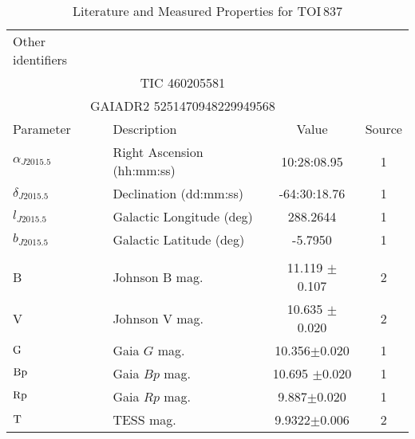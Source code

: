 \begin{table*}
\scriptsize
\setlength{\tabcolsep}{2pt}
\centering
\caption{Literature and Measured Properties for TOI$\,$837}
\label{tab:starparams}
\begin{tabular}{llcc}
  \hline
  \hline
Other identifiers\dotfill & \\
\multicolumn{3}{c}{TIC 460205581} \\
\multicolumn{3}{c}{GAIADR2 5251470948229949568} \\
\hline
\hline
Parameter & Description & Value & Source\\
\hline 
$\alpha_{J2015.5}$\dotfill	&Right Ascension (hh:mm:ss)\dotfill & 10:28:08.95 & 1	\\
$\delta_{J2015.5}$\dotfill	&Declination (dd:mm:ss)\dotfill & -64:30:18.76 & 1	\\
$l_{J2015.5}$\dotfill	&Galactic Longitude (deg)\dotfill & 288.2644 & 1	\\
$b_{J2015.5}$\dotfill	&Galactic Latitude (deg)\dotfill & -5.7950 & 1	\\
\\
B\dotfill			&Johnson B mag.\dotfill & 11.119 $\pm$ 0.107		& 2	\\
V\dotfill			&Johnson V mag.\dotfill & 10.635 $\pm$ 0.020		& 2	\\
${\rm G}$\dotfill     & Gaia $G$ mag.\dotfill     & 10.356$\pm$0.020 & 1\\
${\rm Bp}$\dotfill     & Gaia $Bp$ mag.\dotfill     & 10.695 $\pm$0.020 & 1\\
${\rm Rp}$\dotfill     & Gaia $Rp$ mag.\dotfill     & 9.887$\pm$0.020 & 1\\
${\rm T}$\dotfill     & TESS mag.\dotfill     & 9.9322$\pm$0.006 & 2\\

\end{tabular}
\end{table*}
